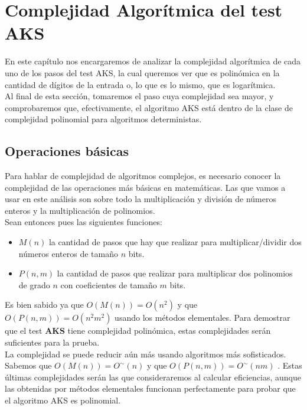 \chapter{Complejidad Algorítmica del test AKS}

En este capítulo nos encargaremos de analizar la complejidad algorítmica de cada uno de los pasos del test AKS, la cual queremos ver que es polinómica en la cantidad de dígitos de la entrada o, lo que es lo mismo, que es logarítmica.\\

Al final de esta sección, tomaremos el paso cuya complejidad sea mayor, y comprobaremos que, efectivamente, el algoritmo AKS está dentro de la clase de complejidad polinomial para algoritmos deterministas.

\section{Operaciones básicas}

Para hablar de complejidad de algoritmos complejos, es necesario conocer la complejidad de las operaciones más básicas en matemáticas. Las que vamos a usar en este análisis son sobre todo la multiplicación y división de números enteros y la multiplicación de polinomios.\\

Sean entonces pues las siguientes funciones:\\

\begin{itemize}
	\item $M(n)$ la cantidad de pasos que hay que realizar para multiplicar/dividir dos números enteros de tamaño $n$ bits.
	
	\item $P(n, m)$ la cantidad de pasos que realizar para multiplicar dos polinomios de grado $n$ con coeficientes de tamaño $m$ bits.
\end{itemize}

Es bien sabido ya que $O(M(n)) = O(n^2)$ y que $O(P(n, m)) = O(n^2m^2)$ usando los métodos elementales. Para demostrar que el test \textbf{AKS} tiene complejidad polinómica, estas complejidades serán suficientes para la prueba.\\

La complejidad se puede reducir aún más usando algoritmos más sofisticados. Sabemos que $O(M(n)) = O^\sim(n)$ y que $O(P(n, m)) = O^\sim(nm)$ \cite{modern_computer_algebra}. Estas últimas complejidades serán las que consideraremos al calcular eficiencias, aunque las obtenidas por métodos elementales funcionan perfectamente para probar que el algoritmo AKS es polinomial.

